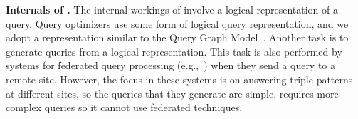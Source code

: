 \vspace{4pt}
\noindent
\textbf{Internals of \rdfframes.}
The internal workings of \rdfframes involve a logical representation of a query.
Query optimizers use some form of logical query representation, and we adopt a representation similar to the Query Graph Model~\cite{Pirahesh:1992}.
Another \rdfframes task is to generate \sparql queries from a logical representation.
This task is also performed by systems for federated \sparql query processing (e.g.,~\cite{fedx}) when they send a query to a remote site.
However, the focus in these systems is on answering \sparql triple patterns at different sites, so the queries that they generate are simple.
\rdfframes requires more complex queries so it cannot use federated \sparql  techniques.

